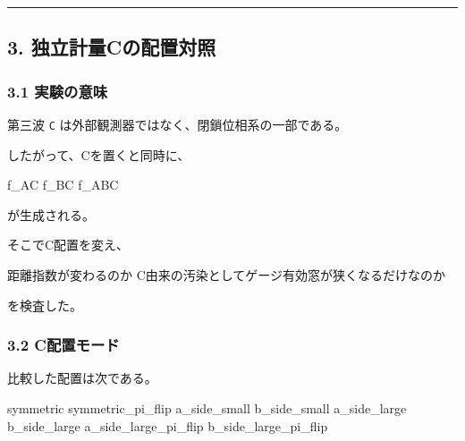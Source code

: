 \documentclass[
]{article}
\newenvironment{Shaded}{}{}
\newcommand{\NormalTok}[1]{#1}
\begin{document}
\begin{center}\rule{0.5\linewidth}{0.5pt}\end{center}

\subsection{3.
独立計量Cの配置対照}\label{ux72ecux7acbux8a08ux91cfcux306eux914dux7f6eux5bfeux7167}

\subsubsection{3.1 実験の意味}\label{ux5b9fux9a13ux306eux610fux5473-1}

第三波 \texttt{C} は外部観測器ではなく、閉鎖位相系の一部である。

したがって、Cを置くと同時に、

\begin{Shaded}
\begin{Highlighting}[]
\NormalTok{f\_AC}
\NormalTok{f\_BC}
\NormalTok{f\_ABC}
\end{Highlighting}
\end{Shaded}

が生成される。

そこでC配置を変え、

\begin{Shaded}
\begin{Highlighting}[]
\NormalTok{距離指数が変わるのか}
\NormalTok{C由来の汚染としてゲージ有効窓が狭くなるだけなのか}
\end{Highlighting}
\end{Shaded}

を検査した。

\subsubsection{3.2 C配置モード}\label{cux914dux7f6eux30e2ux30fcux30c9}

比較した配置は次である。

\begin{Shaded}
\begin{Highlighting}[]
\NormalTok{symmetric}
\NormalTok{symmetric\_pi\_flip}
\NormalTok{a\_side\_small}
\NormalTok{b\_side\_small}
\NormalTok{a\_side\_large}
\NormalTok{b\_side\_large}
\NormalTok{a\_side\_large\_pi\_flip}
\NormalTok{b\_side\_large\_pi\_flip}
\end{Highlighting}
\end{Shaded}
\end{document}
